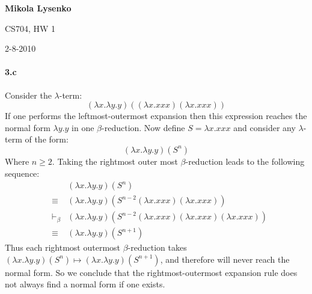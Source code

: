 \documentclass{article}
\begin{document}
\begin{flushright}
{\bf Mikola Lysenko

CS704, HW 1 

2-8-2010}
\end{flushright}

\paragraph{3.c}
Consider the $\lambda$-term:
\[ (\lambda x. \lambda y.y)( (\lambda x.xxx)(\lambda x.xxx) ) \]
If one performs the leftmost-outermost expansion then this expression reaches the normal form $\lambda y.y$ in one $\beta$-reduction.  Now define $S = \lambda x.xxx$ and consider any $\lambda$-term of the form:
\[ (\lambda x. \lambda y.y)( S^n ) \]
Where $n \geq 2$. Taking the rightmost outer most $\beta$-reduction leads to the following sequence:
\begin{eqnarray*}
& & ( \lambda x . \lambda y.y)( S^n ) \\
& \equiv & (\lambda x. \lambda y.y)(S^{n-2} (\lambda x.xxx) (\lambda x.xxx) ) \\
& \vdash_\beta & (\lambda x. \lambda y.y)(S^{n-2} (\lambda x.xxx) (\lambda x.xxx) (\lambda x.xxx) ) \\
& \equiv & ( \lambda x . \lambda y.y)( S^{n+1} )
\end{eqnarray*}
Thus each rightmost outermost $\beta$-reduction takes $(\lambda x. \lambda y.y)(S^n) \mapsto (\lambda x. \lambda y.y)(S^{n+1})$, and therefore will never reach the normal form.  So we conclude that the rightmost-outermost expansion rule does not always find a normal form if one exists.
\end{document}
